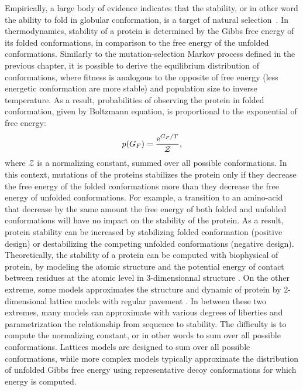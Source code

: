 Empirically, a large body of evidence indicates that the stability, or in other word the ability to fold in globular conformation, is a target of natural selection~\citep{Sikosek2014}.
In thermodynamics, stability of a protein is determined by the Gibbs free energy of its folded conformations, in comparison to the free energy of the unfolded conformations.
Similarly to the mutation-selection Markov process defined in the previous chapter, it is possible to derive the equilibrium distribution of conformations, where fitness is analogous to the opposite of free energy (less energetic conformation are more stable) and population size to inverse temperature.
As a result, probabilities of observing the protein in folded conformation, given by Boltzmann equation, is proportional to the exponential of free energy:
\begin{align}
p(G_F) = \frac{\mathrm{e}^{G_F / T}}{\mathcal{Z}},
\end{align}
where $\mathcal{Z}$ is a normalizing constant, summed over all possible conformations.
In this context, mutations of the proteins stabilizes the protein only if they decrease the free energy of the folded conformations more than they decrease the free energy of unfolded conformations.
For example, a {transition} to an amino-acid that decrease by the same amount the free energy of both folded and unfolded conformations will have no impact on the stability of the protein.
As a result, protein stability can be increased by stabilizing folded conformation (positive design) or destabilizing the competing unfolded conformations (negative design). 
Theoretically, the stability of a protein can be computed with biophysical of protein, by modeling the atomic structure and the potential energy of contact between residues at the atomic level in 3-dimensionnal structure \cite{Goldstein2011}.
On the other extreme, some models approximates the structure and dynamic of protein by 2-dimensional lattice models with regular pavement \cite{Noivirt-Brik2009}.
In between these two extremes, many models can approximate with various degrees of liberties and parametrization the relationship from sequence to stability.
The difficulty is to compute the normalizing constant, or in other words to sum over all possible conformations.
Lattices models are designed to sum over all possible conformations, while more complex models typically approximate the distribution of unfolded Gibbs free energy using representative decoy conformations for which energy is computed.



